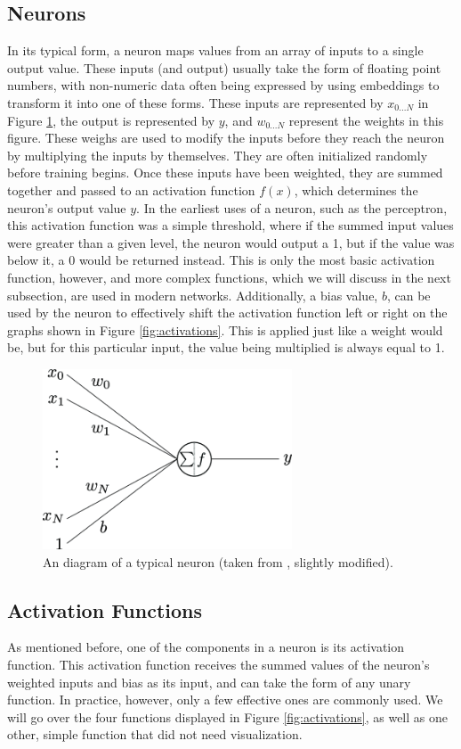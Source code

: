 \documentclass[11pt,a4paper,oldfontcommands]{memoir}
\begin{document}
\subsection{Neurons}
In its typical form, a neuron maps values from an array of inputs to a single output value. These inputs (and output) usually take the form of floating point numbers, with non-numeric data often being expressed by using embeddings to transform it into one of these forms. These inputs are represented by $x_{0...N}$ in Figure \ref{fig:neuron}, the output is represented by $y$, and $w_{0...N}$ represent the weights in this figure. These weighs are used to modify the inputs before they reach the neuron by multiplying the inputs by themselves. They are often initialized randomly before training begins. Once these inputs have been weighted, they are summed together and passed to an activation function $f(x)$, which determines the neuron's output value $y$. In the earliest uses of a neuron, such as the perceptron, this activation function was a simple threshold, where if the summed input values were greater than a given level, the neuron would output a 1, but if the value was below it, a 0 would be returned instead. This is only the most basic activation function, however, and more complex functions, which we will discuss in the next subsection, are used in modern networks. Additionally, a bias value, $b$, can be used by the neuron to effectively shift the activation function left or right on the graphs shown in Figure \ref{fig:activations}. This is applied just like a weight would be, but for this particular input, the value being multiplied is always equal to 1.  

\begin{figure}[h]
    \centering
    \includegraphics[width=20em]{Images/neuron.png}
    \caption{An diagram of a typical neuron (taken from \cite{neuron_image}, slightly modified). }
    \label{fig:neuron}
\end{figure}

\subsection{Activation Functions}
As mentioned before, one of the components in a neuron is its activation function. This activation function receives the summed values of the neuron's weighted inputs and bias as its input, and can take the form of any unary function. In practice, however, only a few effective ones are commonly used. We will go over the four functions displayed in Figure \ref{fig:activations}, as well as one other, simple function that did not need visualization.
\end{document}
